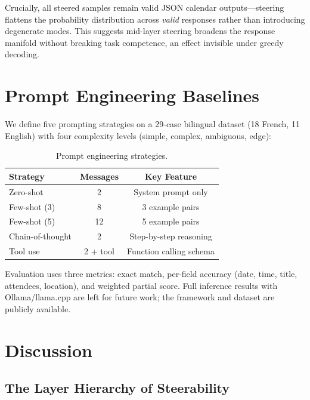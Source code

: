 \documentclass[11pt,a4paper]{article}
\begin{document}
Crucially, all steered samples remain valid JSON calendar outputs---steering flattens the probability distribution across \textit{valid} responses rather than introducing degenerate modes. This suggests mid-layer steering broadens the response manifold without breaking task competence, an effect invisible under greedy decoding.

\section{Prompt Engineering Baselines}
\label{sec:baselines}

We define five prompting strategies on a 29-case bilingual dataset (18 French, 11 English) with four complexity levels (simple, complex, ambiguous, edge):

\begin{table}[H]
\centering
\caption{Prompt engineering strategies.}
\label{tab:strategies}
\begin{tabular}{lcc}
\toprule
\textbf{Strategy} & \textbf{Messages} & \textbf{Key Feature} \\
\midrule
Zero-shot & 2 & System prompt only \\
Few-shot (3) & 8 & 3 example pairs \\
Few-shot (5) & 12 & 5 example pairs \\
Chain-of-thought & 2 & Step-by-step reasoning \\
Tool use & 2 + tool & Function calling schema \\
\bottomrule
\end{tabular}
\end{table}

Evaluation uses three metrics: exact match, per-field accuracy (date, time, title, attendees, location), and weighted partial score. Full inference results with Ollama/llama.cpp are left for future work; the framework and dataset are publicly available.

\section{Discussion}
\label{sec:discussion}

\subsection{The Layer Hierarchy of Steerability}
\end{document}
